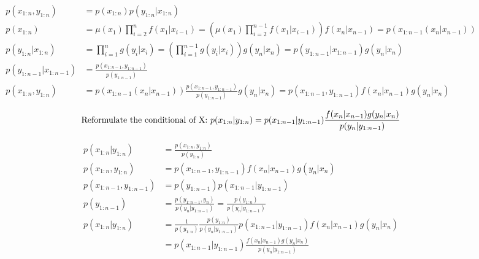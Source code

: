\documentclass{article}
\begin{document}
\begin{equation}
\begin{split}
p(x_{1:n},y_{1:n}) &= p(x_{1:n}) p(y_{1:n}|x_{1:n})\\
p(x_{1:n}) &= \mu(x_1)\prod_{i=2}^{n} f(x_1|x_{i-1})
= (\mu(x_1)\prod_{i=2}^{n-1} f(x_1|x_{i-1})) f(x_n|x_{n-1})
= p(x_{1:n-1} (x_n|x_{n-1}))\\
p(y_{1:n}|x_{1:n}) &= \prod_{i=1}^{n} g(y_i|x_i)
= (\prod_{i=1}^{n-1} g(y_i|x_i)) g(y_n|x_n)
= p(y_{1:n-1}|x_{1:n-1}) g(y_n|x_n)\\
p(y_{1:n-1}|x_{1:n-1}) &= \frac{p(x_{1:n-1},y_{1:n-1})}{p(y_{1:n-1})}\\
p(x_{1:n},y_{1:n}) &= p(x_{1:n-1} (x_n|x_{n-1})) \frac{p(x_{1:n-1},y_{1:n-1})}{p(y_{1:n-1})} g(y_n|x_n)
= p(x_{1:n-1},y_{1:n-1}) f(x_n|x_{n-1}) g(y_n|x_n)
\end{split}
\end{equation}

\begin{equation}
\textnormal{Reformulate the conditional of X: }
p(x_{1:n}|y_{1:n}) = p(x_{1:n-1}|y_{1:n-1})\frac{f(x_n|x_{n-1}) g(y_n|x_n)}{p(y_n|y_{1:n-1})}
\end{equation}

\begin{equation}
\begin{split}
p(x_{1:n}|y_{1:n}) &= \frac{p(x_{1:n},y_{1:n})}{p(y_{1:n})}\\
p(x_{1:n},y_{1:n}) &= p(x_{1:n-1},y_{1:n-1}) f(x_n|x_{n-1}) g(y_n|x_n)\\
p(x_{1:n-1},y_{1:n-1}) &= p(y_{1:n-1}) p(x_{1:n-1}|y_{1:n-1})\\
p(y_{1:n-1}) &= \frac{p(y_{1:n-1},y_n)}{p(y_n|y_{1:n-1})} = \frac{p(y_{1:n})}{p(y_n|y_{1:n-1})}\\
p(x_{1:n}|y_{1:n}) &= \frac{1}{p(y_{1:n})}\frac{p(y_{1:n})}{p(y_n|y_{1:n-1})} p(x_{1:n-1}|y_{1:n-1}) f(x_n|x_{n-1}) g(y_n|x_n)\\
&= p(x_{1:n-1}|y_{1:n-1})\frac{f(x_n|x_{n-1}) g(y_n|x_n)}{p(y_n|y_{1:n-1})}\\
\end{split}
\end{equation}
\end{document}
